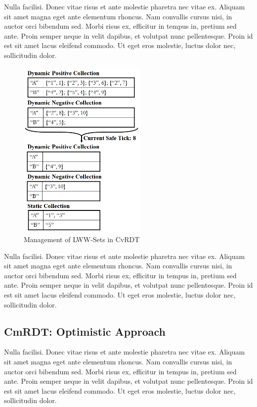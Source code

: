 \documentclass[sigconf,nonacm,11pt]{acmart}
\begin{document}
Nulla facilisi. Donec vitae risus et ante molestie pharetra nec vitae ex. Aliquam sit amet magna eget ante elementum rhoncus. Nam convallis cursus nisi, in auctor orci bibendum sed. Morbi risus ex, efficitur in tempus in, pretium sed ante. Proin semper neque in velit dapibus, et volutpat nunc pellentesque. Proin id est sit amet lacus eleifend commodo. Ut eget eros molestie, luctus dolor nec, sollicitudin dolor.

\begin{figure}[h]
  \centering
  \includegraphics[width=6.25cm]{Fig3CvRDT2}
  \caption{Management of LWW-Sets in CvRDT}
  \label{fig:cvrdt2}
\end{figure}

Nulla facilisi. Donec vitae risus et ante molestie pharetra nec vitae ex. Aliquam sit amet magna eget ante elementum rhoncus. Nam convallis cursus nisi, in auctor orci bibendum sed. Morbi risus ex, efficitur in tempus in, pretium sed ante. Proin semper neque in velit dapibus, et volutpat nunc pellentesque. Proin id est sit amet lacus eleifend commodo. Ut eget eros molestie, luctus dolor nec, sollicitudin dolor.

\subsection{CmRDT: Optimistic Approach}

Nulla facilisi. Donec vitae risus et ante molestie pharetra nec vitae ex. Aliquam sit amet magna eget ante elementum rhoncus. Nam convallis cursus nisi, in auctor orci bibendum sed. Morbi risus ex, efficitur in tempus in, pretium sed ante. Proin semper neque in velit dapibus, et volutpat nunc pellentesque. Proin id est sit amet lacus eleifend commodo. Ut eget eros molestie, luctus dolor nec, sollicitudin dolor.
\end{document}
